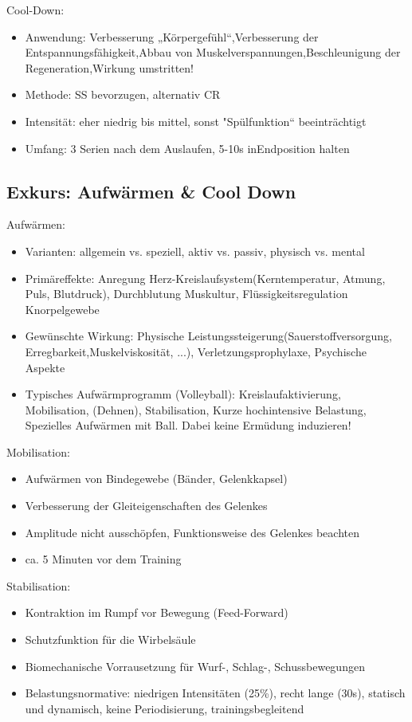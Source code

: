 Cool-Down:
\begin{itemize}
    \item Anwendung: Verbesserung „Körpergefühl“,Verbesserung der Entspannungsfähigkeit,Abbau von Muskelverspannungen,Beschleunigung der Regeneration,Wirkung umstritten!
    \item Methode: SS bevorzugen, alternativ CR
    \item Intensität: eher niedrig bis mittel, sonst "Spülfunktion“ beeinträchtigt
    \item Umfang: 3 Serien nach dem Auslaufen, 5-10s inEndposition halten
\end{itemize}

\subsection{Exkurs: Aufwärmen \& Cool Down}

Aufwärmen:
\begin{itemize}
    \item Varianten:  allgemein vs. speziell, aktiv vs. passiv, physisch vs. mental
    \item Primäreffekte: Anregung Herz-Kreislaufsystem(Kerntemperatur, Atmung, Puls, Blutdruck), Durchblutung Muskultur, Flüssigkeitsregulation Knorpelgewebe
    \item Gewünschte Wirkung: Physische Leistungssteigerung(Sauerstoffversorgung, Erregbarkeit,Muskelviskosität, ...), Verletzungsprophylaxe, Psychische Aspekte
    \item Typisches Aufwärmprogramm (Volleyball): Kreislaufaktivierung, Mobilisation, (Dehnen), Stabilisation, Kurze hochintensive Belastung, Spezielles Aufwärmen mit Ball. Dabei keine Ermüdung induzieren!
\end{itemize}

Mobilisation:
\begin{itemize}
    \item Aufwärmen von Bindegewebe (Bänder, Gelenkkapsel)
    \item Verbesserung der Gleiteigenschaften des Gelenkes
    \item Amplitude nicht ausschöpfen, Funktionsweise des Gelenkes beachten
    \item ca. 5 Minuten vor dem Training
\end{itemize}

Stabilisation:
\begin{itemize}
    \item Kontraktion im Rumpf vor Bewegung (Feed-Forward)
    \item Schutzfunktion für die Wirbelsäule
    \item Biomechanische Vorrausetzung für Wurf-, Schlag-, Schussbewegungen
    \item Belastungsnormative: niedrigen Intensitäten (25\%), recht lange (30s), statisch und dynamisch, keine Periodisierung, trainingsbegleitend
\end{itemize}

